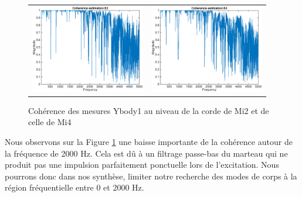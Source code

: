 \begin{figure}[h]
\centering
\begin{tabular}{cc}
   \includegraphics[width = 5cm]{figures/coherence_Z_1_E2.eps} &
   \includegraphics[width = 5cm]{figures/coherence_Z_1_E4.eps} \\
\end{tabular}
\caption{Cohérence des mesures Ybody1 au niveau de la corde de Mi2 et de celle de Mi4}
\label{fig:gall}
\end{figure}
Nous observons sur la Figure \ref{fig:gall} une baisse importante de la cohérence autour de la fréquence de 2000 Hz. Cela est dû à un filtrage passe-bas du marteau qui ne produit pas une impulsion parfaitement ponctuelle lors de l'excitation. Nous pourrons donc dans nos synthèse, limiter notre recherche des modes de corps à la région fréquentielle entre 0 et 2000 Hz.
